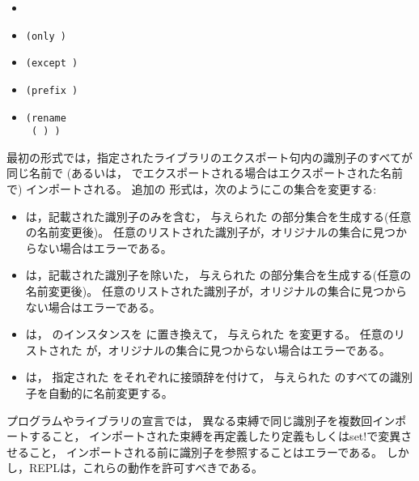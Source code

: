 \begin{itemize}
\item {\tt{}}
\item {\tt(only   \dotsfoo)}
\item {\tt(except   \dotsfoo)}
\item {\tt(prefix  )}
\item {\tt(rename \\
{\obeyspaces%
\hspace*{4em}( ) \dotsfoo)}}
\end{itemize}

最初の形式では，指定されたライブラリのエクスポート句内の識別子のすべてが同じ名前で
(あるいは， でエクスポートされる場合はエクスポートされた名前で)
インポートされる。
追加の  形式は，次のようにこの集合を変更する:

\begin{itemize}

\item {} は，記載された識別子のみを含む，
  与えられた  の部分集合を生成する(任意の名前変更後)。
  任意のリストされた識別子が，オリジナルの集合に見つからない場合はエラーである。

\item {} は，記載された識別子を除いた，
  与えられた  の部分集合を生成する(任意の名前変更後)。
  任意のリストされた識別子が，オリジナルの集合に見つからない場合はエラーである。

\item {} は， のインスタンスを  に置き換えて，
  与えられた  を変更する。
  任意のリストされた  が，オリジナルの集合に見つからない場合はエラーである。

\item {} は，
  指定された  をそれぞれに接頭辞を付けて，
  与えられた  のすべての識別子を自動的に名前変更する。

\end{itemize}

プログラムやライブラリの宣言では，
異なる束縛で同じ識別子を複数回インポートすること，
インポートされた束縛を再定義したり定義もしくは{\cf set!}で変異させること，
インポートされる前に識別子を参照することはエラーである。
しかし，REPLは，これらの動作を許可すべきである。

